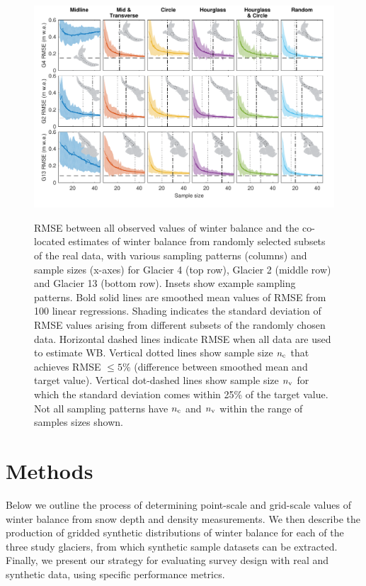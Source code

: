 \documentclass[twocolumn,letterpaper]{igs}
\begin{document}
\begin{figure}
	\centering
	\includegraphics[width =\textwidth]{DataObsWB.pdf}\\
	\caption{RMSE between all observed values of winter balance and the co-located estimates of winter balance from randomly selected subsets of the real data, with various sampling patterns (columns) and sample sizes (x-axes) for Glacier 4 (top row), Glacier 2 (middle row) and Glacier 13 (bottom row). Insets show example sampling patterns. Bold solid lines are smoothed mean values of RMSE from 100 linear regressions. Shading indicates the standard deviation of RMSE values arising from different subsets of the randomly chosen data. Horizontal dashed lines indicate RMSE when all data are used to estimate WB.  Vertical dotted lines show sample size $n_{\rm c}$ that achieves RMSE $\leq 5$\% (difference between smoothed mean and target value). Vertical dot-dashed lines show sample size $n_{\rm v}$ for which the standard deviation comes within 25\% of the target value. Not all sampling patterns have $n_{\rm c}$ and $n_{\rm v}$ within the range of samples sizes shown.}
	\label{fig:RealObsWB}
\end{figure}


\section{Methods}

Below we outline the process of determining point-scale and grid-scale values of winter balance from snow depth and density measurements. We then describe the production of gridded synthetic distributions of winter balance for each of the three study glaciers, from which synthetic sample datasets can be extracted. Finally, we present our strategy for evaluating survey design with real and synthetic data, using specific performance metrics. 
\end{document}
